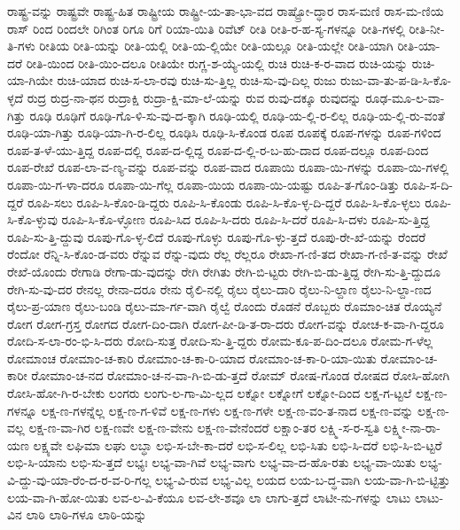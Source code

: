{ರಾಷ್ಟ್ರ-ವನ್ನು
ರಾಷ್ಟ್ರವೇ
ರಾಷ್ಟ್ರ-ಹಿತ
ರಾಷ್ಟ್ರೀಯ
ರಾಷ್ಟ್ರೀ-ಯ-ತಾ-ಭಾ-ವದ
ರಾಷ್ಟ್ರೋ-ದ್ಧಾರ
ರಾಸ-ಮಣಿ
ರಾಸ-ಮ-ಣಿಯ
ರಾಸ್
ರಿಂದ
ರಿಂದಲೇ
ರಿಗಿಂತ
ರಿಗೂ
ರಿಗೆ
ರಿಯಾ-ಯಿತಿ
ರಿವೆಟ್
ರೀತಿ
ರೀತಿ-ರ-ಹ-ಸ್ಯ-ಗಳನ್ನೂ
ರೀತಿ-ಗಳಲ್ಲಿ
ರೀತಿ-ನೀ-ತಿ-ಗಳು
ರೀತಿಯ
ರೀತಿ-ಯನ್ನು
ರೀತಿ-ಯಲ್ಲಿ
ರೀತಿ-ಯ-ಲ್ಲಿಯೇ
ರೀತಿ-ಯಲ್ಲೂ
ರೀತಿ-ಯಲ್ಲೇ
ರೀತಿ-ಯಾಗಿ
ರೀತಿ-ಯಾ-ದರೆ
ರೀತಿ-ಯಿಂದ
ರೀತಿ-ಯಿಂ-ದಲೂ
ರೀತಿಯೇ
ರುಗ್ಣ-ಶ-ಯ್ಯೆ-ಯಲ್ಲಿ
ರುಚಿ
ರುಚಿ-ಕ-ರ-ವಾದ
ರುಚಿ-ಯನ್ನು
ರುಚಿ-ಯಾ-ಗಿಯೇ
ರುಚಿ-ಯಾದ
ರುಚಿ-ಸ-ಲಾ-ರವು
ರುಚಿ-ಸು-ತ್ತಿಲ್ಲ
ರುಚಿ-ಸು-ವು-ದಿಲ್ಲ
ರುಜು
ರುಜು-ವಾ-ತು-ಪ-ಡಿ-ಸಿ-ಕೊ-ಳ್ಳದೆ
ರುದ್ರ
ರುದ್ರ-ನಾ-ಥನ
ರುದ್ರಾಕ್ಷಿ
ರುದ್ರಾ-ಕ್ಷಿ-ಮಾ-ಲೆ-ಯನ್ನು
ರುವ
ರುವು-ದಕ್ಕೂ
ರುವುದನ್ನು
ರೂಢ-ಮೂ-ಲ-ವಾ-ಗಿತ್ತು
ರೂಢಿ
ರೂಢಿಗೆ
ರೂಢಿ-ಗೊ-ಳಿ-ಸು-ವು-ದ-ಕ್ಕಾಗಿ
ರೂಢಿ-ಯಲ್ಲಿ
ರೂಢಿ-ಯ-ಲ್ಲಿ-ರ-ಲಿಲ್ಲ
ರೂಢಿ-ಯ-ಲ್ಲಿ-ರು-ವಂತೆ
ರೂಢಿ-ಯಾ-ಗಿತ್ತು
ರೂಢಿ-ಯಾ-ಗಿ-ರ-ಲಿಲ್ಲ
ರೂಢಿಸಿ
ರೂಢಿ-ಸಿ-ಕೊಂಡ
ರೂಪ
ರೂಪಕ್ಕೆ
ರೂಪ-ಗಳನ್ನು
ರೂಪ-ಗಳಿಂದ
ರೂಪ-ತ-ಳೆ-ಯು-ತ್ತಿದ್ದ
ರೂಪ-ದಲ್ಲಿ
ರೂಪ-ದ-ಲ್ಲಿದ್ದ
ರೂಪ-ದ-ಲ್ಲಿ-ರ-ಬ-ಹು-ದಾದ
ರೂಪ-ದಲ್ಲೂ
ರೂಪ-ದಿಂದ
ರೂಪ-ರೇಖೆ
ರೂಪ-ಲಾ-ವ-ಣ್ಯ-ವನ್ನು
ರೂಪ-ವನ್ನು
ರೂಪ-ವಾದ
ರೂಪಾಯಿ
ರೂಪಾ-ಯಿ-ಗಳನ್ನು
ರೂಪಾ-ಯಿ-ಗಳಲ್ಲಿ
ರೂಪಾ-ಯಿ-ಗ-ಳಾ-ದರೂ
ರೂಪಾ-ಯಿ-ಗೆಲ್ಲ
ರೂಪಾ-ಯಿಯ
ರೂಪಾ-ಯಿ-ಯಷ್ಟು
ರೂಪಿ-ತ-ಗೊಂ-ಡಿತ್ತು
ರೂಪಿ-ಸ-ದಿ-ದ್ದರೆ
ರೂಪಿ-ಸಲು
ರೂಪಿ-ಸಿ-ಕೊಂ-ಡಿ-ದ್ದರು
ರೂಪಿ-ಸಿ-ಕೊಂಡು
ರೂಪಿ-ಸಿ-ಕೊ-ಳ್ಳ-ದಿ-ದ್ದರೆ
ರೂಪಿ-ಸಿ-ಕೊ-ಳ್ಳಲು
ರೂಪಿ-ಸಿ-ಕೊ-ಳ್ಳುವು
ರೂಪಿ-ಸಿ-ಕೊ-ಳ್ಳೋಣ
ರೂಪಿ-ಸಿದ
ರೂಪಿ-ಸಿ-ದರು
ರೂಪಿ-ಸಿ-ದರೆ
ರೂಪಿ-ಸಿ-ದಳು
ರೂಪಿ-ಸು-ತ್ತಿದ್ದ
ರೂಪಿ-ಸು-ತ್ತಿ-ದ್ದುವು
ರೂಪು-ಗೊ-ಳ್ಳ-ಲಿದೆ
ರೂಪು-ಗೊಳ್ಳು
ರೂಪು-ಗೊ-ಳ್ಳು-ತ್ತದೆ
ರೂಪು-ರೇ-ಖೆ-ಯನ್ನು
ರೆಂದರೆ
ರೆಂದೋ
ರೆನ್ನಿ-ಸಿ-ಕೊಂ-ಡ-ವರು
ರೆನ್ನುವ
ರೆನ್ನು-ವುದು
ರೆಲ್ಲ
ರೆಲ್ಲರೂ
ರೇಖಾ-ಗ-ಣಿ-ತದ
ರೇಖಾ-ಗ-ಣಿ-ತ-ವನ್ನು
ರೇಖೆ
ರೇಖೆ-ಯೊಂದು
ರೇಗಾಡಿ
ರೇಗಾ-ಡು-ವುದನ್ನು
ರೇಗಿ
ರೇಗಿತು
ರೇಗಿ-ಬಿ-ಟ್ಟರು
ರೇಗಿ-ಬಿ-ಡು-ತ್ತಿದ್ದ
ರೇಗಿ-ಸು-ತ್ತಿ-ದ್ದುದೂ
ರೇಗಿ-ಸು-ವು-ದರ
ರೇನಲ್ಲ
ರೇನಾ-ದರೂ
ರೇನು
ರೈಲಿ-ನಲ್ಲಿ
ರೈಲು
ರೈಲು-ದಾರಿ
ರೈಲು-ನಿ-ಲ್ದಾಣ
ರೈಲು-ನಿ-ಲ್ದಾ-ಣದ
ರೈಲು-ಪ್ರ-ಯಾಣ
ರೈಲು-ಬಂಡಿ
ರೈಲು-ಮಾ-ರ್ಗ-ವಾಗಿ
ರೈಲ್ವೆ
ರೊಂದು
ರೊಡನೆ
ರೊಬ್ಬರು
ರೊಮಾಂ-ಚಿತ
ರೊಯ್ಯನೆ
ರೋಗ
ರೋಗ-ಗ್ರಸ್ತ
ರೋಗದ
ರೋಗ-ದಿಂ-ದಾಗಿ
ರೋಗ-ಪೀ-ಡಿ-ತ-ರಾ-ದರು
ರೋಗ-ವನ್ನು
ರೋಚ-ಕ-ವಾ-ಗಿ-ದ್ದರೂ
ರೋದಿ-ಸ-ಲಾ-ರಂ-ಭಿ-ಸಿ-ದರು
ರೋದಿ-ಸುತ್ತ
ರೋದಿ-ಸು-ತ್ತಿ-ದ್ದರು
ರೋಮ-ಕೂ-ಪ-ದಿಂ-ದಲೂ
ರೋಮ-ಗ-ಳೆಲ್ಲ
ರೋಮಾಂಚ
ರೋಮಾಂ-ಚ-ಕಾರಿ
ರೋಮಾಂ-ಚ-ಕಾ-ರಿ-ಯಾದ
ರೋಮಾಂ-ಚ-ಕಾ-ರಿ-ಯಾ-ಯಿತು
ರೋಮಾಂ-ಚ-ಕಾರೀ
ರೋಮಾಂ-ಚ-ನದ
ರೋಮಾಂ-ಚ-ನ-ವಾ-ಗಿ-ಬಿ-ಡು-ತ್ತದೆ
ರೋಮ್
ರೋಷ-ಗೊಂಡ
ರೋಷದ
ರೋಸಿ-ಹೋಗಿ
ರೋಸಿ-ಹೋ-ಗಿ-ರ-ಬೇಕು
ಲಂಗರು
ಲಂಗು-ಲ-ಗಾ-ಮಿ-ಲ್ಲದ
ಲಕ್ನೋ
ಲಕ್ನೋಗೆ
ಲಕ್ನೋ-ದಿಂದ
ಲಕ್ಷ-ಗ-ಟ್ಟಲೆ
ಲಕ್ಷ-ಣ-ಗಳನ್ನೂ
ಲಕ್ಷ-ಣ-ಗಳನ್ನೆಲ್ಲ
ಲಕ್ಷ-ಣ-ಗ-ಳಿವೆ
ಲಕ್ಷ-ಣ-ಗಳು
ಲಕ್ಷ-ಣ-ಗಳೇ
ಲಕ್ಷ-ಣ-ವಂ-ತ-ನಾದ
ಲಕ್ಷ-ಣ-ವನ್ನು
ಲಕ್ಷ-ಣ-ವಲ್ಲ
ಲಕ್ಷ-ಣ-ವಾ-ಗಿರ
ಲಕ್ಷ-ಣವೇ
ಲಕ್ಷ-ಣ-ವೇನು
ಲಕ್ಷ-ಣ-ವೇನೆಂದರೆ
ಲಕ್ಷಾಂ-ತರ
ಲಕ್ಷ್ಮಿ-ಸ-ರ-ಸ್ವತಿ
ಲಕ್ಷ್ಮೀ-ನಾ-ರಾ-ಯಣ
ಲಕ್ಷ್ಯವೇ
ಲಘಿಮಾ
ಲಘು
ಲಬ್ಧಾ
ಲಭಿ-ಸ-ಬೇ-ಕಾ-ದರೆ
ಲಭಿ-ಸ-ಲಿಲ್ಲ
ಲಭಿ-ಸಿತು
ಲಭಿ-ಸಿ-ದರೆ
ಲಭಿ-ಸಿ-ಬಿ-ಟ್ಟರೆ
ಲಭಿ-ಸಿ-ಯಾನು
ಲಭಿ-ಸು-ತ್ತದೆ
ಲಭ್ಯಃ
ಲಭ್ಯ-ವಾ-ಗಿವೆ
ಲಭ್ಯ-ವಾಗು
ಲಭ್ಯ-ವಾ-ದ-ಹೊ-ರತು
ಲಭ್ಯ-ವಾ-ಯಿತು
ಲಭ್ಯ-ವಿ-ದ್ದು-ವು-ಯಾ-ರೆಂ-ದ-ರ-ವ-ರಿ-ಗಲ್ಲ
ಲಭ್ಯ-ವಿ-ರುವ
ಲಭ್ಯ-ವಿಲ್ಲ
ಲಯದ
ಲಯ-ಬ-ದ್ಧ-ವಾಗಿ
ಲಯ-ವಾ-ಗಿ-ಬಿ-ಟ್ಟಿತ್ತು
ಲಯ-ವಾ-ಗಿ-ಹೋ-ಯಿತು
ಲವ-ಲ-ವಿ-ಕೆಯೂ
ಲವ-ಲೇ-ಶವೂ
ಲಾ
ಲಾಗು-ತ್ತದೆ
ಲಾಟೀ-ನು-ಗಳನ್ನು
ಲಾಟು
ಲಾಟು-ವಿನ
ಲಾಠಿ
ಲಾಠಿ-ಗಳೂ
ಲಾಠಿ-ಯನ್ನು
}
